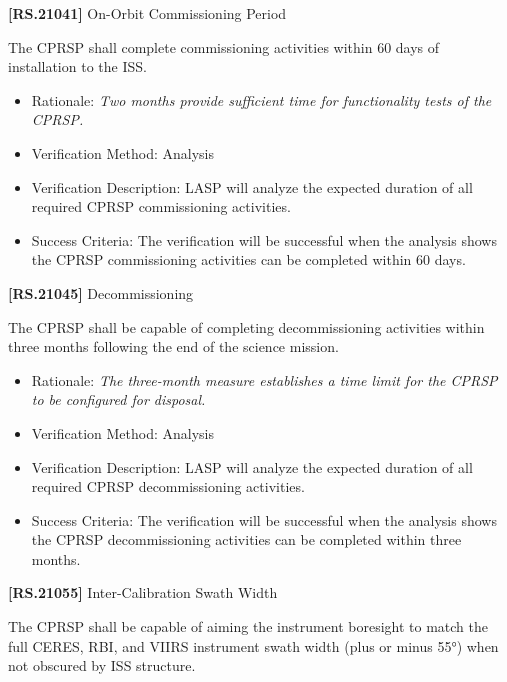 \documentclass[12pt,oneside,oldfontcommands]{memoir}
\begin{document}
\textbf{[RS.21041]} On-Orbit Commissioning Period

The \gls{CPRSP} shall complete commissioning activities within 60 days of installation to the \gls{ISS}.

\begin{itemize}
\item{} Rationale: \emph{Two months provide sufficient time for functionality tests of the CPRSP.}

\item{} Verification Method: Analysis

\item{} Verification Description: \gls{LASP} will analyze the expected duration of all required \gls{CPRSP} commissioning activities.

\item{} Success Criteria: The verification will be successful when the \gls{analysis} shows the \gls{CPRSP} commissioning activities can be completed within 60 days.

\end{itemize}

\textbf{[RS.21045]} Decommissioning

The \gls{CPRSP} shall be capable of completing decommissioning activities within three months following the end of the science mission.

\begin{itemize}
\item{} Rationale: \emph{The three-month measure establishes a time limit for the CPRSP to be configured for disposal.}

\item{} Verification Method: Analysis

\item{} Verification Description: \gls{LASP} will analyze the expected duration of all required \gls{CPRSP} decommissioning activities.

\item{} Success Criteria: The verification will be successful when the \gls{analysis} shows the \gls{CPRSP} decommissioning activities can be completed within three months.

\end{itemize}

\textbf{[RS.21055]} Inter-Calibration Swath Width

The \gls{CPRSP} shall be capable of aiming the instrument boresight to match the full \gls{CERES}, \gls{RBI}, and \gls{VIIRS} instrument swath width (plus or minus 55°) when not obscured by \gls{ISS} structure.
\end{document}
